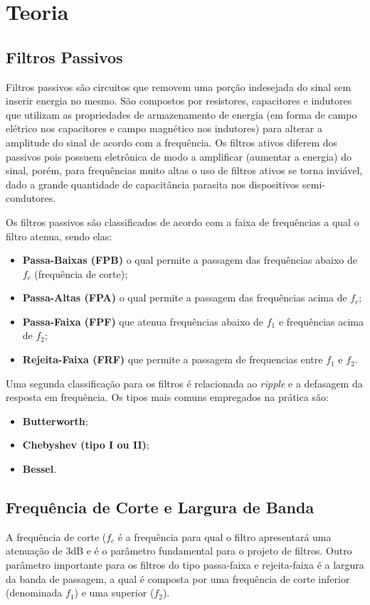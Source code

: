 \newpage
\section{Teoria}
\subsection{Filtros Passivos}
Filtros passivos são circuitos que removem uma porção indesejada do sinal sem inserir energia no mesmo. São compostos por resistores, capacitores e indutores que utilizam as propriedades de armazenamento de energia (em forma de campo elétrico nos capacitores e campo magnético nos indutores) para alterar a amplitude do sinal de acordo com a frequência. Os filtros ativos diferem dos passivos pois possuem eletrônica de modo a amplificar (aumentar a energia) do sinal, porém, para frequências muito altas o uso de filtros ativos se torna inviável, dado a grande quantidade de capacitância parasita nos dispositivos semi-condutores.

Os filtros passivos são classificados de acordo com a faixa de frequências a qual o filtro atenua, sendo elas:
\begin{itemize}
\item \textbf{Passa-Baixas (FPB)} o qual permite a passagem das frequências abaixo de $f_c$ (frequência de corte);

\item \textbf{Passa-Altas (FPA)} o qual permite a passagem das frequências acima de $f_c$;

\item \textbf{Passa-Faixa (FPF)} que atenua frequências abaixo de $f_1$ e frequências acima de $f_2$;

\item \textbf{Rejeita-Faixa (FRF)} que permite a passagem de frequencias entre $f_1$ e $f_2$.

\end{itemize}

Uma segunda classificação para os filtros é relacionada ao \textit{ripple} e a defasagem da resposta em frequência. Os tipos mais comuns empregados na prática são:

\begin{itemize}
\item \textbf{Butterworth};
\item \textbf{Chebyshev (tipo I ou II)};
\item \textbf{Bessel}.
\end{itemize}

\subsection{Frequência de Corte e Largura de Banda}
A frequência de corte ($f_c$ é a frequência para qual o filtro apresentará uma atenuação de 3dB e é o parâmetro fundamental para o projeto de filtros.
Outro parâmetro importante para os filtros do tipo passa-faixa e rejeita-faixa é a largura da banda de passagem, a qual é composta por uma frequência de corte inferior (denominada $f_1$) e uma superior ($f_2$).

